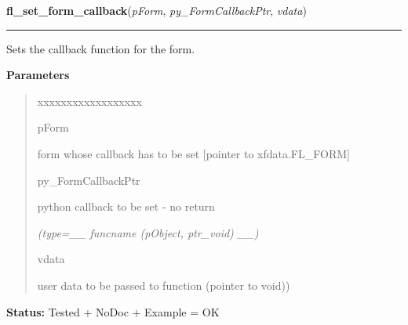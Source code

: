 \hspace{.8\funcindent}\begin{boxedminipage}{\funcwidth}

    \raggedright \textbf{fl\_set\_form\_callback}(\textit{pForm}, \textit{py\_FormCallbackPtr}, \textit{vdata})

    \vspace{-1.5ex}

    \rule{\textwidth}{0.5\fboxrule}
\setlength{\parskip}{2ex}
    Sets the callback function for the form.

\setlength{\parskip}{1ex}
      \textbf{Parameters}
      \vspace{-1ex}

      \begin{quote}
        \begin{Ventry}{xxxxxxxxxxxxxxxxxx}

          \item[pForm]

          form whose callback has to be set [pointer to xfdata.FL\_FORM]

          \item[py\_FormCallbackPtr]

          python callback to be set - no return

            {\it (type=\_\_ funcname (pObject, ptr\_void) \_\_)}

          \item[vdata]

          user data to be passed to function (pointer to void))

        \end{Ventry}

      \end{quote}

\textbf{Status:} Tested + NoDoc + Example = OK



    \end{boxedminipage}

    \label{xformslib:library:fl_set_form_callback}

    \vspace{0.5ex}

